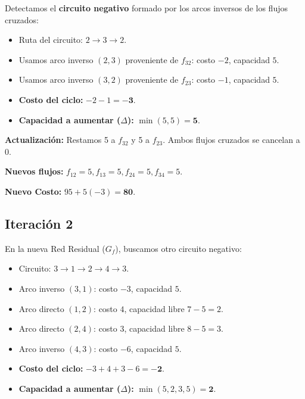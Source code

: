 \documentclass[10pt,a4paper]{article}
\begin{document}
Detectamos el \textbf{circuito negativo} 
formado por los arcos inversos de los flujos cruzados:

\begin{itemize}
    \item Ruta del circuito: $2 \to 3 \to 2$.
    \item Usamos arco inverso $(2,3)$ proveniente de $f_{32}$: costo $-2$, capacidad $5$.
    \item Usamos arco inverso $(3,2)$ proveniente de $f_{23}$: costo $-1$, capacidad $5$.
    \item \textbf{Costo del ciclo:} $-2 - 1 = \mathbf{-3}$.
    \item \textbf{Capacidad a aumentar ($\Delta$):} $\min(5, 5) = \mathbf{5}$.
\end{itemize}

\vspace{1mm}

\textbf{Actualización:} Restamos 5 a $f_{32}$ y 5 a $f_{23}$. Ambos flujos cruzados se cancelan a 0. 

\vspace{1mm}

\textbf{Nuevos flujos:} $f_{12}=5, f_{13}=5, f_{24}=5, f_{34}=5$. 

\vspace{1mm}

\textbf{Nuevo Costo:} $95 + 5(-3) = \mathbf{80}$.

\subsection{Iteración 2}

En la nueva Red Residual ($G_f$), buscamos otro circuito negativo:


\begin{itemize}
    \item Circuito: $3 \to 1 \to 2 \to 4 \to 3$.
    \item Arco inverso $(3,1)$: costo $-3$, capacidad $5$.
    \item Arco directo $(1,2)$: costo $4$, capacidad libre $7-5 = 2$.
    \item Arco directo $(2,4)$: costo $3$, capacidad libre $8-5 = 3$.
    \item Arco inverso $(4,3)$: costo $-6$, capacidad $5$.
    \item \textbf{Costo del ciclo:} $-3 + 4 + 3 - 6 = \mathbf{-2}$.
    \item \textbf{Capacidad a aumentar ($\Delta$):} $\min(5, 2, 3, 5) = \mathbf{2}$.
\end{itemize}
\end{document}
